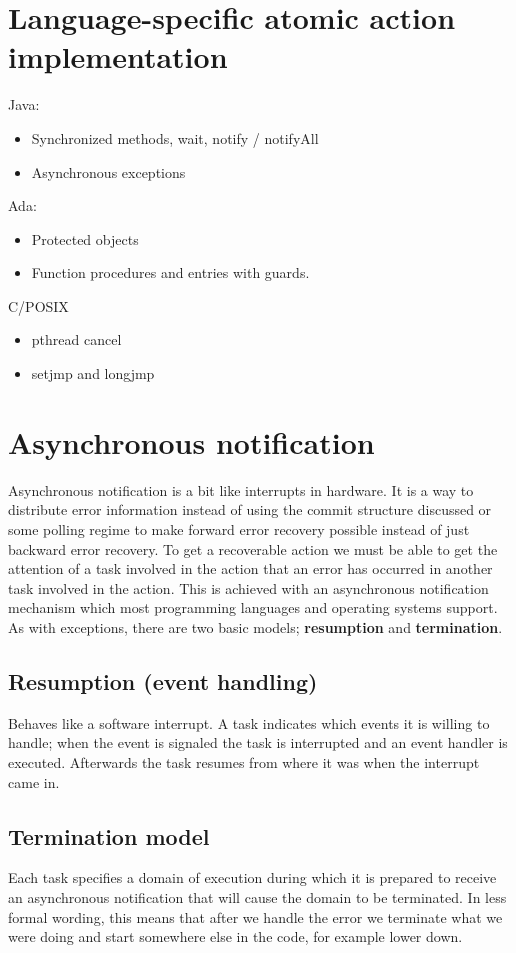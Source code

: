 \section{Language-specific atomic action implementation}
Java:
\begin{itemize}
\item Synchronized methods, wait, notify / notifyAll
\item Asynchronous exceptions
\end{itemize}
Ada:
\begin{itemize}
\item Protected objects
\item Function procedures and entries with guards.
\end{itemize}
C/POSIX
\begin{itemize}
\item pthread cancel
\item setjmp and longjmp
\end{itemize}

\section{Asynchronous notification}
Asynchronous notification is a bit like interrupts in hardware. It is a way to distribute error information instead of using the commit structure discussed or some polling regime to make forward error recovery possible instead of just backward error recovery. To get a recoverable action we must be able to get the attention of a task involved in the action that an error has occurred in another task involved in the action. This is achieved with an asynchronous notification mechanism which most programming languages and operating systems support. As with exceptions, there are two basic models; \textbf{resumption} and \textbf{termination}. 

\subsection{Resumption (event handling)}
Behaves like a software interrupt. A task indicates which events it is willing to handle; when the event is signaled the task is interrupted and an event handler is executed. Afterwards the task resumes from where it was when the interrupt came in.

\subsection{Termination model}
Each task specifies a domain of execution during which it is prepared to receive  an asynchronous notification that will cause the domain to be terminated. In less formal wording, this means that after we handle the error we terminate what we were doing and start somewhere else in the code, for example lower down.


